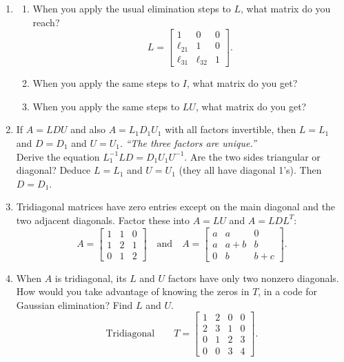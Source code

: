 \documentclass[14pt, a4paper]{article}
\begin{document}
\begin{enumerate}[resume]
    \item
          \begin{enumerate}
              \item When you apply the usual elimination steps to $L$, what matrix do you reach?
                    \[
                        L = \begin{bmatrix}
                            1         & 0         & 0 \\
                            \ell_{21} & 1         & 0 \\
                            \ell_{31} & \ell_{32} & 1
                        \end{bmatrix}.
                    \]
              \item When you apply the same steps to $I$, what matrix do you get?
              \item When you apply the same steps to $LU$, what matrix do you get?
          \end{enumerate}

    \item If $A = LDU$ and also $A = L_1 D_1 U_1$ with all factors invertible, then $L = L_1$ and $D = D_1$ and $U = U_1$. \textit{``The three factors are unique.''}\\
          Derive the equation $L_1^{-1}LD = D_1 U_1 U^{-1}$. Are the two sides triangular or diagonal? Deduce $L = L_1$ and $U = U_1$ (they all have diagonal 1's). Then $D = D_1$.

    \item Tridiagonal matrices have zero entries except on the main diagonal and the two adjacent diagonals. Factor these into $A = LU$ and $A = LDL^T$:
          \[
              A = \begin{bmatrix}
                  1 & 1 & 0 \\
                  1 & 2 & 1 \\
                  0 & 1 & 2
              \end{bmatrix}
              \quad\text{and}\quad
              A = \begin{bmatrix}
                  a & a   & 0   \\
                  a & a+b & b   \\
                  0 & b   & b+c
              \end{bmatrix}.
          \]

    \item When $A$ is tridiagonal, its $L$ and $U$ factors have only two nonzero diagonals. How would you take advantage of knowing the zeros in $T$, in a code for Gaussian elimination? Find $L$ and $U$.
          \[
              \text{Tridiagonal}\qquad
              T = \begin{bmatrix}
                  1 & 2 & 0 & 0 \\
                  2 & 3 & 1 & 0 \\
                  0 & 1 & 2 & 3 \\
                  0 & 0 & 3 & 4
              \end{bmatrix}.
          \]


\end{enumerate}
\end{document}
